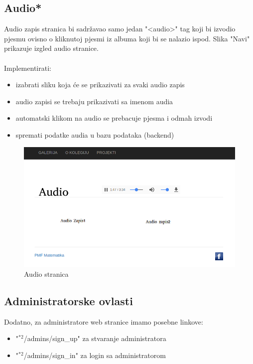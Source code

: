 \documentclass[]{article}
\begin{document}
\subsection{Audio*}
Audio zapis stranica bi sadržavao samo jedan "<audio>" tag koji bi izvodio pjesmu ovisno o kliknutoj pjesmi iz albuma koji bi se nalazio ispod. Slika "Navi" prikazuje izgled audio stranice.
\\
\\
Implementirati:
\begin{itemize}
	\item izabrati sliku koja će se prikazivati za svaki audio zapis
	\item audio zapisi se trebaju prikazivati sa imenom audia
	\item automatski klikom na audio se prebacuje pjesma i odmah izvodi
	\item spremati podatke audia u bazu podataka (backend)
\end{itemize}

\begin{figure}[h]
	\centering
	\includegraphics[scale=0.3]{audio}
	\caption{Audio stranica}
	\label{fig:mesh1}
\end{figure}

\newpage

\subsection{Administratorske ovlasti}
Dodatno, za administratore web stranice imamo posebne linkove:
\begin{itemize}
	\item "$^{*2}$/admins/sign\_up" za stvaranje administratora
	\item "$^{*2}$/admins/sign\_in" za login sa administratorom
\end{itemize}
\end{document}
